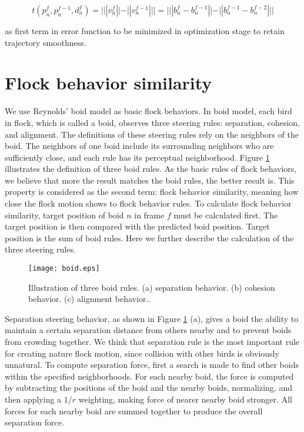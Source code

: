 \begin{equation}\label{eq:4}
 t(p_n^f, p_n^{f-1},d_n^f) = |||v_n^f||-||v_n^{f-1}||| = |||b_n^f-b_n^{f-1}|| - ||b_n^{f-1}-b_n^{f-2}|||
\end{equation}

as first term in error function to be minimized in optimization stage to retain trajectory smoothness.


\section{Flock behavior similarity}


We use Reynolds' boid model as basic flock behaviors. In boid model, each bird in flock, which is called a boid, observes three steering rules: separation, cohesion, and alignment. The definitions of these steering rules rely on the neighbors of the boid. The neighbors of one boid include its surrounding neighbors who are sufficiently close, and each rule has its perceptual neighborhood. Figure \ref{figure:boid} illustrates the definition of three boid rules. As the basic rules of flock behaviors, we believe that more the result matches the boid rules, the better result is. This property is considered as the second term: flock behavior similarity, meaning how close the flock motion shows to flock behavior rules. To calculate flock behavior similarity, target position of boid $n$ in frame $f$ must be calculated first. The target position is then compared with the predicted boid position. Target position is the sum of boid rules. Here we further describe the calculation of the three steering rules.


\begin{figure}[h]
 \begin{center}
  \texttt{[image: boid.eps]}
 \end{center}
 \caption{Illustration of three boid rules. (a) separation behavior. (b) cohesion behavior. (c) alignment behavior..}
 \label{figure:boid}
\end{figure}


Separation steering behavior, as shown in Figure \ref{figure:boid} (a), gives a boid the ability to maintain a certain separation distance from others nearby and to prevent boids from crowding together. We think that separation rule is the most important rule for creating nature flock motion, since collision with other birds is obviously unnatural. To compute separation force, first a search is made to find other boids within the specified neighborhoods. For each nearby boid, the force is computed by subtracting the positions of the boid and the nearby boids, normalizing, and then applying a $1/r$ weighting, making force of nearer nearby boid stronger. All forces for each nearby boid are summed together to produce the overall separation force.


